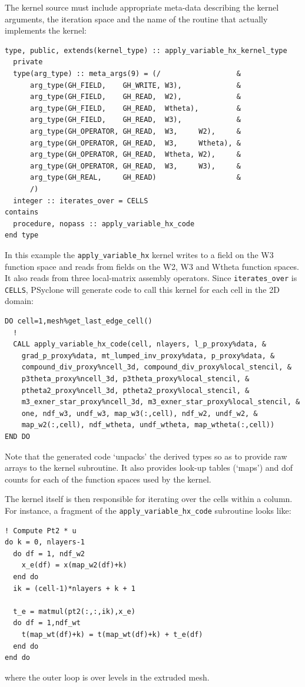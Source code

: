 \documentclass[times]{elsarticle}
\begin{document}
The kernel source must include appropriate meta-data describing the
kernel arguments, the iteration space and the name of the routine
that actually implements the kernel:
\begin{lstlisting}
type, public, extends(kernel_type) :: apply_variable_hx_kernel_type
  private
  type(arg_type) :: meta_args(9) = (/                  &
      arg_type(GH_FIELD,    GH_WRITE, W3),             &
      arg_type(GH_FIELD,    GH_READ,  W2),             &
      arg_type(GH_FIELD,    GH_READ,  Wtheta),         &
      arg_type(GH_FIELD,    GH_READ,  W3),             &
      arg_type(GH_OPERATOR, GH_READ,  W3,     W2),     &
      arg_type(GH_OPERATOR, GH_READ,  W3,     Wtheta), &
      arg_type(GH_OPERATOR, GH_READ,  Wtheta, W2),     &
      arg_type(GH_OPERATOR, GH_READ,  W3,     W3),     &
      arg_type(GH_REAL,     GH_READ)                   &
      /)
  integer :: iterates_over = CELLS
contains
  procedure, nopass :: apply_variable_hx_code
end type
\end{lstlisting}
In this example the \texttt{apply\_variable\_hx} kernel writes to a field on the
W3 function space and reads from fields on the W2, W3 and Wtheta
function spaces. It also reads from three local-matrix assembly operators.
Since \texttt{iterates\_over} is \texttt{CELLS}, PSyclone will generate code
to call this kernel for each cell in the 2D domain:
\begin{lstlisting}
DO cell=1,mesh%get_last_edge_cell()
  !
  CALL apply_variable_hx_code(cell, nlayers, l_p_proxy%data, &
    grad_p_proxy%data, mt_lumped_inv_proxy%data, p_proxy%data, &
    compound_div_proxy%ncell_3d, compound_div_proxy%local_stencil, &
    p3theta_proxy%ncell_3d, p3theta_proxy%local_stencil, &
    ptheta2_proxy%ncell_3d, ptheta2_proxy%local_stencil, &
    m3_exner_star_proxy%ncell_3d, m3_exner_star_proxy%local_stencil, &
    one, ndf_w3, undf_w3, map_w3(:,cell), ndf_w2, undf_w2, &
    map_w2(:,cell), ndf_wtheta, undf_wtheta, map_wtheta(:,cell))
END DO 
\end{lstlisting}
Note that the generated code `unpacks' the derived types so as to
provide raw arrays to the kernel subroutine. It also provides look-up
tables (`maps') and dof counts for each of the function spaces used by
the kernel. 

The kernel itself is then responsible for iterating over the cells
within a column. For instance, a fragment of the
\texttt{apply\_variable\_hx\_code} subroutine looks like:
\begin{lstlisting}
! Compute Pt2 * u
do k = 0, nlayers-1
  do df = 1, ndf_w2  
    x_e(df) = x(map_w2(df)+k)
  end do
  ik = (cell-1)*nlayers + k + 1
    
  t_e = matmul(pt2(:,:,ik),x_e)
  do df = 1,ndf_wt
    t(map_wt(df)+k) = t(map_wt(df)+k) + t_e(df)
  end do
end do
\end{lstlisting}
where the outer loop is over levels in the extruded mesh.
\end{document}
